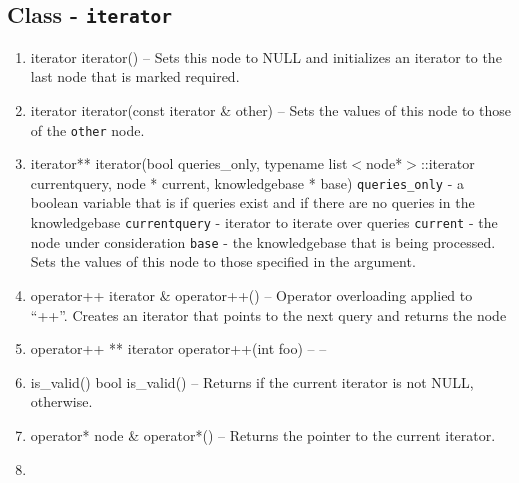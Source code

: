 \subsection{Class - \texttt{iterator}}
\begin{enumerate}
\item \begin{detail}
{iterator}
{iterator()}
{--}
{Sets this node to NULL and initializes an iterator to the last node that is marked required. } 
\end{detail}
\item \begin{detail}
{iterator}
{iterator(const iterator \& other)}
{--}
{Sets the values of this node to those of the \texttt{other} node.} 
\end{detail}
\item \begin{detail}
{iterator**}
{iterator(bool queries\_only, typename list$<$node*$>$::iterator currentquery, node * current, knowledgebase * base)}
{\texttt{queries\_only} - a boolean variable that is \true if queries exist and \false if there are no queries in the knowledgebase
 \texttt{currentquery} - iterator to iterate over queries
 \texttt{current} - the node under consideration
 \texttt{base} - the knowledgebase that is being processed.}
{Sets the values of this node to those specified in the argument.} 
\end{detail}
\item \begin{detail}
{operator++}
{iterator \& operator++()}
{--}
{Operator overloading applied to ``++''. Creates an iterator that points to the next query and returns the node} 
\end{detail}
\item \begin{detail}
{operator++ **}
{iterator operator++(int foo)}
{--}
{--} 
\end{detail}
\item \begin{detail}
{is\_valid()}
{bool is\_valid()}
{--}
{Returns \true if the current iterator is not NULL, \false otherwise.} 
\end{detail}
\item \begin{detail}
{operator*}
{node \& operator*()}
{--}
{Returns the pointer to the current iterator.} 
\end{detail}
\item \begin{detail}

\end{detail}
\end{enumerate}
